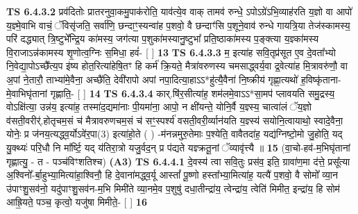 \documentclass[17pt]{extarticle}
\begin{document}
                  \newline
                                \textbf{ TS 6.4.3.2} \newline
                  प्रव॑दितोः प्रातरनुवा॒कमु॒पाक॑रोति॒ याव॑त्ये॒व वाक् तामव॑ रुन्धे॒ ऽपोऽग्रे॑ऽभि॒व्याह॑रति य॒ज्ञो वा आपो॑ य॒ज्ञ्मे॒वाभि वाचं॒ ॅविसृ॑जति॒ सर्वा॑णि॒ छन्दाꣳ॒॒स्यन्वा॑ह प॒शवो॒ वै छन्दाꣳ॑सि प॒शूने॒वाव॑ रुन्धे गायत्रि॒या तेज॑स्कामस्य॒ परि॑ दद्ध्यात् त्रि॒ष्टुभे᳚न्द्रि॒य का॑मस्य॒ जग॑त्या प॒शुका॑मस्यानु॒ष्टुभा᳚ प्रति॒ष्ठाका॑मस्य प॒ङ्क्त्या य॒ज्ञ्का॑मस्य वि॒राजाऽन्न॑कामस्य शृ॒णोत्व॒ग्निः स॒मिधा॒ हवं॑- [  ] \textbf{  13} \newline
                  \newline
                                \textbf{ TS 6.4.3.3} \newline
                  म॒ इत्या॑ह सवि॒तृप्र॑सूत ए॒व दे॒वता᳚भ्यो नि॒वेद्या॒पोऽच्छै᳚त्य॒प इ॑ष्य होत॒रित्या॑हेषि॒तꣳ हि कर्म॑ क्रि॒यते॒ मैत्रा॑वरुणस्य चमसाद्ध्वर्य॒वा द्र॒वेत्या॑ह मि॒त्रावरु॑णौ॒ वा अ॒पां ने॒तारौ॒ ताभ्या॑मे॒वैना॒ अच्छै॑ति॒ देवी॑रापो अपां नपा॒दित्या॒हाऽऽ*हु॑त्यै॒वैना॑ नि॒ष्क्रीय॑ गृह्णा॒त्यथो॑ ह॒विष्कृ॑ताना-मे॒वाभिघृ॑तानां गृह्णाति॒- [  ] \textbf{  14} \newline
                  \newline
                                \textbf{ TS 6.4.3.4} \newline
                  कार्.षि॑र॒सीत्या॑ह॒ शम॑लमे॒वाऽऽ*सा॒मप॑ प्लावयति समु॒द्रस्य॒ वोऽक्षि॑त्या॒ उन्न॑य॒ इत्या॑ह॒ तस्मा॑द॒द्यमा॑नाः पी॒यमा॑ना॒ आपो॒ न क्षी॑यन्ते॒ योनि॒र्वै य॒ज्ञ्स्य॒ चात्वा॑लं ॅय॒ज्ञो व॑सती॒वरीर्॑.होतृचम॒सं च॑ मैत्रावरुणचम॒सं च॑ सꣳ॒॒स्पर्श्य॑ वसती॒वरी॒र्व्यान॑यति य॒ज्ञ्स्य॑ सयोनि॒त्वायाथो॒ स्वादे॒वैना॒ योनेः॒ प्र ज॑नय॒त्यद्ध्व॒र्योऽवे॑र॒पा(3) इत्या॑हो॒ते ( ) -म॑नन्नमुरु॒तेमाः प॒श्येति॒ वावैतदा॑ह॒ यद्य॑ग्निष्टो॒मो जु॒होति॒ यद् यु॒क्थ्यः॑ परि॒धौ नि मा᳚र्ष्टि॒ यद् य॑तिरा॒त्रो यजु॒र्वद॒न् प्र प॑द्यते यज्ञ्क्रतू॒नां ॅव्यावृ॑त्त्यै ॥ \textbf{  15 } \newline
                  \newline
                      (वा॒चो-हव॑-म॒भिघृ॑तानां गृह्णात्यु॒ - त - पञ्च॑विꣳशतिश्च)  \textbf{(A3)} \newline \newline
                                        \textbf{ TS 6.4.4.1} \newline
                  दे॒वस्य॑ त्वा सवि॒तुः प्रस॑व॒ इति॒ ग्रावा॑ण॒मा द॑त्ते॒ प्रसू᳚त्या अ॒श्विनो᳚-र्बा॒हुभ्या॒मित्या॑हा॒श्विनौ॒ हि दे॒वाना॑मद्ध्व॒र्यू आस्तां᳚ पू॒ष्णो हस्ता᳚भ्या॒मित्या॑ह॒ यत्यै॑ प॒शवो॒ वै सोमो᳚ व्या॒न उ॑पाꣳशु॒सव॑नो॒ यदु॑पाꣳशु॒सव॑न-म॒भि मिमी॑ते व्या॒नमे॒व प॒शुषु॑ दधा॒तीन्द्रा॑य॒ त्वेन्द्रा॑य॒ त्वेति॑ मिमीत॒ इन्द्रा॑य॒ हि सोम॑ आह्रि॒यते॒ पञ्च॒ कृत्वो॒ यजु॑षा मिमीते॒- [  ] \textbf{  16} \newline
\end{document}
